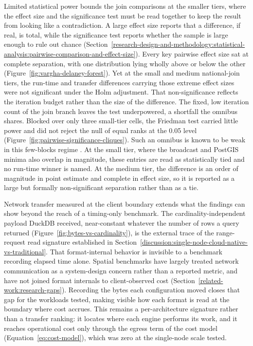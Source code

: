 Limited statistical power bounds the join comparisons at the smaller tiers, where the effect size and the significance test must be read together to keep the result from looking like a contradiction. A large effect size reports that a difference, if real, is total, while the significance test reports whether the sample is large enough to rule out chance \parencite{arcuri2014_hitchhiker_statistical_tests} (Section~\ref{research-design-and-methodology:statistical-analysis:pairwise-comparison-and-effect-size}). Every key pairwise effect size sat at complete separation, with one distribution lying wholly above or below the other (Figure~\ref{fig:vargha-delaney-forest}). Yet at the small and medium national-join tiers, the run-time and transfer differences carrying those extreme effect sizes were not significant under the Holm adjustment. That non-significance reflects the iteration budget rather than the size of the difference. The fixed, low iteration count of the join branch leaves the test underpowered, a shortfall the omnibus shares. Blocked over only three small-tier cells, the Friedman test carried little power and did not reject the null of equal ranks at the \num{0.05} level (Figure~\ref{fig:pairwise-significance-cliques}). Such an omnibus is known to be weak in this few-blocks regime \parencite{demsar2006_statistical_comparisons_classifiers}. At the small tier, where the broadcast and PostGIS minima also overlap in magnitude, these entries are read as statistically tied and no run-time winner is named. At the medium tier, the difference is an order of magnitude in point estimate and complete in effect size, so it is reported as a large but formally non-significant separation rather than as a tie.

Network transfer measured at the client boundary extends what the findings can show beyond the reach of a timing-only benchmark. The cardinality-independent payload DuckDB received, near-constant whatever the number of rows a query returned (Figure~\ref{fig:bytes-vs-cardinality}), is the external trace of the range-request read signature established in Section~\ref{discussion:single-node-cloud-native-vs-traditional}. That format-internal behavior is invisible to a benchmark recording elapsed time alone. Spatial benchmarks have largely treated network communication as a system-design concern rather than a reported metric, and have not joined format internals to client-observed cost \parencite{tang2020_locationspark_distributed_spatial_query,folkerts2012_benchmarking_in_the_cloud} (Section~\ref{related-work:research-gaps}). Recording the bytes each configuration moved closes that gap for the workloads tested, making visible how each format is read at the boundary where cost accrues. This remains a per-architecture signature rather than a transfer ranking: it locates where each engine performs its work, and it reaches operational cost only through the egress term of the cost model (Equation~\ref{eq:cost-model}), which was zero at the single-node scale tested.

